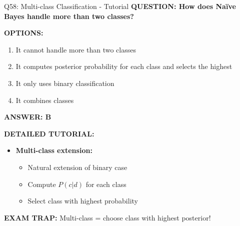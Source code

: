 \documentclass[8pt]{beamer}
\begin{document}
	\begin{frame}{Q58: Multi-class Classification - Tutorial}
		\fontsize{6.5}{7.5}\selectfont
		\textbf{QUESTION: How does Naïve Bayes handle more than two classes?}
		
		\vspace{0.1cm}
		\textbf{OPTIONS:}
		\begin{enumerate}
			\item It cannot handle more than two classes
			\item It computes posterior probability for each class and selects the highest
			\item It only uses binary classification
			\item It combines classes
		\end{enumerate}
		
		\vspace{0.1cm}
		\textcolor{myblue}{\textbf{ANSWER: B}}
		
		\vspace{0.1cm}
		\textbf{DETAILED TUTORIAL:}
		\begin{itemize}
			\item \textbf{Multi-class extension:}
			\begin{itemize}
				\item Natural extension of binary case
				\item Compute $P(c|d)$ for each class
				\item Select class with highest probability
			\end{itemize}
		\end{itemize}
		
		\textcolor{myred}{\textbf{EXAM TRAP:}} Multi-class = \textcolor{myblue}{choose class with highest posterior}!
	\end{frame}
	
\end{document}
